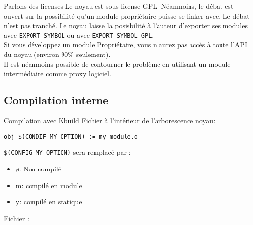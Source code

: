 \begin{frame}[fragile=singleslide]{Parlons des licenses}
  Le noyau est sous license GPL. Néanmoins, le débat est ouvert sur la
  possibilité  qu'un module  propriétaire puisse  se linker  avec.  Le
  débat n'est pas  tranché. Le noyau laisse la  posisbilité à l'auteur
  d'exporter   ses   modules   avec   \verb+EXPORT_SYMBOL+   ou   avec
  \verb+EXPORT_SYMBOL_GPL+.
\\[2ex]
  Si vous développez un module Propriétaire, vous n'aurez pas accès à
  toute l'API du noyau (environ 90\% seulement).
\\[2ex]
  Il est néanmoins possible de contourner le problème en utilisant un
  module intermédiaire comme proxy logiciel.
\end{frame}

\subsection{Compilation interne}

\begin{frame}[fragile=singleslide]{Compilation avec Kbuild}
  Fichier  à l'intérieur de l'arborescence noyau:
  \begin{lstlisting}
obj-$(CONDIF_MY_OPTION) := my_module.o  
  \end{lstlisting} %
  \lstinline+$(CONFIG_MY_OPTION)+ sera remplacé par :
  \begin{itemize}
  \item ø: Non compilé
  \item m: compilé en module
  \item y: compilé en statique
  \end{itemize}
  Fichier :
  
\end{frame} 

